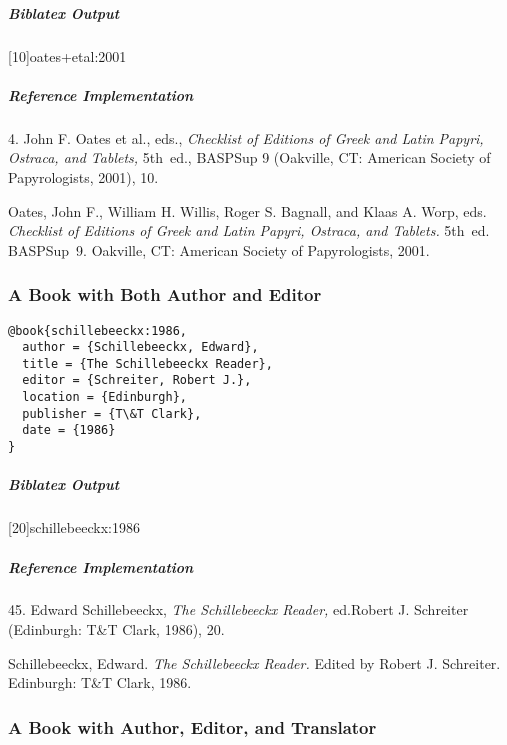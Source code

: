 \documentclass[a4paper]{article}
\newenvironment{biboutput}{%
  \subparagraph{Biblatex Output}
}{\color{black}}
\newenvironment{refimp}{%
  \subparagraph{Reference Implementation}
  \color{reference-colour}
  \rm
}{\par\color{black}}
\begin{document}
\begin{biboutput}
  [10]{oates+etal:2001}
\end{biboutput}

\begin{refimp}
  \hspace*{\bibindent}4. John F. Oates et al., eds., \emph{Checklist of
  Editions of Greek and Latin Papyri, Ostraca, and Tablets,} 5th~ed., BASPSup
  9 (Oakville, CT: American Society of Papyrologists, 2001), 10.

  \hangindent\bibindent Oates, John F., William H. Willis, Roger S. Bagnall,
  and Klaas A. Worp, eds. \emph{Checklist of Editions of Greek and Latin
  Papyri, Ostraca, and Tablets.} 5th~ed. BASPSup~9. Oakville, CT: American
  Society of Papyrologists, 2001.

\end{refimp}

\subsubsection{A Book with Both Author and Editor}

\begin{lstlisting}
@book{schillebeeckx:1986,
  author = {Schillebeeckx, Edward},
  title = {The Schillebeeckx Reader},
  editor = {Schreiter, Robert J.},
  location = {Edinburgh},
  publisher = {T\&T Clark},
  date = {1986}
}
\end{lstlisting}  

\begin{biboutput}
  [20]{schillebeeckx:1986}
\end{biboutput}

\begin{refimp}
  \hspace*{\bibindent}45. Edward Schillebeeckx, \emph{The Schillebeeckx
  Reader,} ed.\@ Robert J. Schreiter (Edinburgh: T\&T Clark, 1986), 20.

  \hangindent\bibindent Schillebeeckx, Edward. \emph{The Schillebeeckx
  Reader.} Edited by Robert J. Schreiter. Edinburgh: T\&T Clark, 1986.
\end{refimp}

\subsubsection{A Book with Author, Editor, and Translator}
\end{document}
